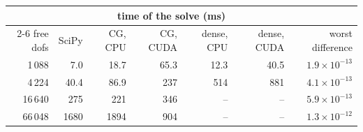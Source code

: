 \begin{tabular}{@{}r r r r r r r@{}}
\toprule
& \multicolumn{5}{c}{time of the solve (ms)} & \\
\cmidrule(lr){2-6}
free dofs & SciPy & CG, CPU & CG, CUDA & dense, CPU & dense, CUDA & worst difference \\
\midrule
1\,088 & 7.0 & 18.7 & 65.3 & 12.3 & 40.5 & $1.9\times10^{-13}$ \\
4\,224 & 40.4 & 86.9 & 237 & 514 & 881 & $4.1\times10^{-13}$ \\
16\,640 & 275 & 221 & 346 & -- & -- & $5.9\times10^{-13}$ \\
66\,048 & 1680 & 1894 & 904 & -- & -- & $1.3\times10^{-12}$ \\
\bottomrule
\end{tabular}
